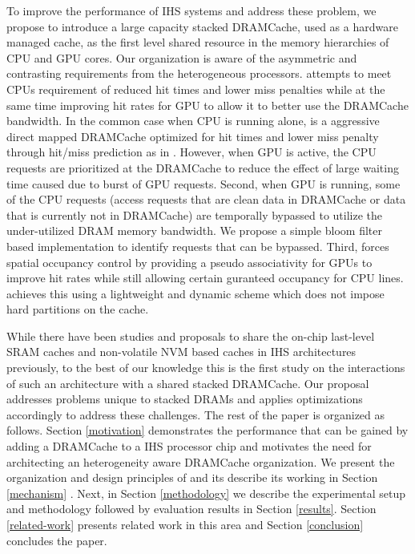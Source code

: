 To improve the performance of IHS systems and address these problem, we propose to introduce a large capacity stacked DRAMCache, used as a hardware managed cache, as the first level shared resource in the memory hierarchies of CPU and GPU cores. Our organization \cachename is aware of the asymmetric and contrasting requirements from the heterogeneous processors. \cachename attempts to meet CPUs requirement of reduced hit times and lower miss penalties while at the same time improving hit rates for GPU to allow it to better use the DRAMCache bandwidth. In the common case when CPU is running alone, \textit{\cachename} is a aggressive direct mapped DRAMCache optimized for hit times and lower miss penalty through hit/miss prediction as in \cite{alloy}. However, when GPU is active, the CPU requests are prioritized at the DRAMCache to reduce the effect of large waiting time caused due to burst of GPU requests. Second, when GPU is running, some of the CPU requests (access requests that are clean data in DRAMCache or data that is currently not in DRAMCache) are temporally bypassed to utilize the under-utilized DRAM memory bandwidth. We propose a simple bloom filter based implementation to identify requests that can be bypassed. Third, \cachename forces spatial occupancy control by providing a pseudo associativity for GPUs to improve hit rates while still allowing certain guranteed occupancy for CPU lines. \cachename achieves this using a lightweight and dynamic scheme which does not impose hard partitions on the cache.


\par While there have been studies and proposals to share the on-chip last-level SRAM caches \cite{helm} and non-volatile NVM based caches \cite{oscar} in IHS architectures previously, to the best of our knowledge this is the first study on the interactions of such an architecture with a shared stacked DRAMCache. Our proposal \cachename addresses problems unique to stacked DRAMs and applies optimizations accordingly to address these challenges. The rest of the paper is organized as follows. Section \ref{motivation} demonstrates the performance that can be gained by adding a DRAMCache to a IHS processor chip and motivates the need for architecting an heterogeneity aware DRAMCache organization. We present the organization and design principles of \cachename and its describe its working in Section \ref{mechanism} . Next, in Section \ref{methodology} we describe the experimental setup and methodology followed by evaluation results in Section \ref{results}. Section \ref{related-work} presents related work in this area and Section \ref{conclusion} concludes the paper.

